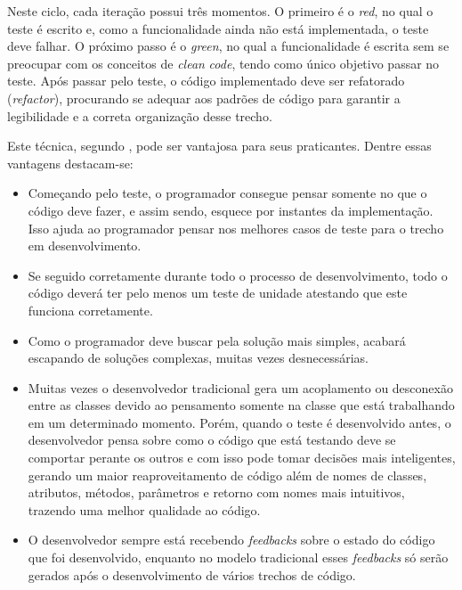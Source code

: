 Neste ciclo, cada iteração possui três momentos. O primeiro é o \textit{red}, no qual o teste é escrito e, como a funcionalidade ainda não está implementada, o teste deve falhar. O próximo passo é o \textit{green}, no qual a funcionalidade é escrita sem se preocupar com os conceitos de \textit{clean} \textit{code}, tendo como único objetivo passar no teste. Após passar pelo teste, o código implementado deve ser refatorado (\textit{refactor}), procurando se adequar aos padrões de código para garantir a legibilidade e a correta organização desse trecho.

Este técnica, segundo , pode ser vantajosa para seus praticantes. Dentre essas vantagens destacam-se:

\begin{itemize}
    \item Começando pelo teste, o programador consegue pensar somente no que o código deve fazer, e assim sendo, esquece por instantes da implementação. Isso ajuda ao programador pensar nos melhores casos de teste para o trecho em desenvolvimento.
    \item Se seguido corretamente durante todo o processo de desenvolvimento, todo o código deverá ter pelo menos um teste de unidade atestando que este funciona corretamente.
    \item Como o programador deve buscar pela solução mais simples, acabará escapando de soluções complexas, muitas vezes desnecessárias.
    \item Muitas vezes o desenvolvedor tradicional gera um acoplamento ou desconexão entre as classes devido ao pensamento somente na classe que está trabalhando em um determinado momento. Porém, quando o teste é desenvolvido antes, o desenvolvedor pensa sobre como o código que está testando deve se comportar perante os outros e com isso pode tomar decisões mais inteligentes, gerando um maior reaproveitamento de código além de nomes de classes, atributos, métodos, parâmetros e retorno com nomes mais intuitivos, trazendo uma melhor qualidade ao código. 
    \item O desenvolvedor sempre está recebendo \textit{feedbacks} sobre o estado do código que foi desenvolvido, enquanto no modelo tradicional esses \textit{feedbacks} só serão gerados após o desenvolvimento de vários trechos de código.
\end{itemize}


